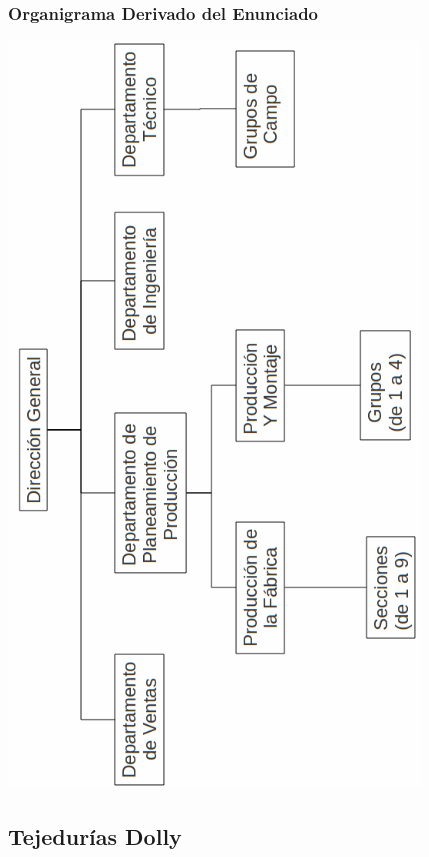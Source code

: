 \documentclass[a4paper,10pt,titlepage]{article}
\begin{document}
\subsubsection{Organigrama Derivado del Enunciado}
\begin{center}
\includegraphics[width=310pt]{./herculesDiag.png}
 \end{center}

\newpage
\subsection{Tejedur\'ias Dolly}
\end{document}
